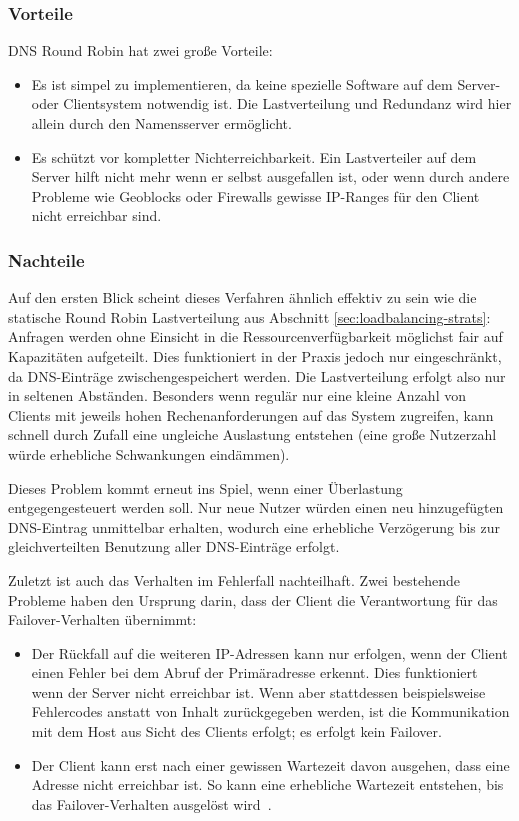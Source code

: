 \subsubsection{Vorteile}
DNS Round Robin hat zwei große Vorteile:
\begin{itemize}
	\item Es ist simpel zu implementieren, da keine spezielle Software auf dem Server- oder Clientsystem notwendig ist. Die Lastverteilung und Redundanz wird hier allein durch den Namensserver ermöglicht.
	\item Es schützt vor kompletter Nichterreichbarkeit. Ein Lastverteiler auf dem Server hilft nicht mehr wenn er selbst ausgefallen ist, oder wenn durch andere Probleme wie Geoblocks oder Firewalls gewisse IP-Ranges für den Client nicht erreichbar sind.
\end{itemize}

\subsubsection{Nachteile}
Auf den ersten Blick scheint dieses Verfahren ähnlich effektiv zu sein wie die statische Round Robin Lastverteilung aus Abschnitt \ref{sec:loadbalancing-strats}:
Anfragen werden ohne Einsicht in die Ressourcenverfügbarkeit möglichst fair auf Kapazitäten aufgeteilt.
Dies funktioniert in der Praxis jedoch nur eingeschränkt, da DNS-Einträge zwischengespeichert werden.
Die Lastverteilung erfolgt also nur in seltenen Abständen.
Besonders wenn regulär nur eine kleine Anzahl von Clients mit jeweils hohen Rechenanforderungen auf das System zugreifen,
kann schnell durch Zufall eine ungleiche Auslastung entstehen (eine große Nutzerzahl würde erhebliche Schwankungen eindämmen).

Dieses Problem kommt erneut ins Spiel, wenn einer Überlastung entgegengesteuert werden soll.
Nur neue Nutzer würden einen neu hinzugefügten DNS-Eintrag unmittelbar erhalten, wodurch eine erhebliche Verzögerung bis zur gleichverteilten Benutzung aller DNS-Einträge erfolgt.

Zuletzt ist auch das Verhalten im Fehlerfall nachteilhaft.
Zwei bestehende Probleme haben den Ursprung darin, dass der Client die Verantwortung für das Failover-Verhalten übernimmt:
\begin{itemize}
	\item Der Rückfall auf die weiteren IP-Adressen kann nur erfolgen, wenn der Client einen Fehler bei dem Abruf der Primäradresse erkennt. Dies funktioniert wenn der Server nicht erreichbar ist. Wenn aber stattdessen beispielsweise Fehlercodes anstatt von Inhalt zurückgegeben werden, ist die Kommunikation mit dem Host aus Sicht des Clients erfolgt; es erfolgt kein Failover.
	\item Der Client kann erst nach einer gewissen Wartezeit davon ausgehen, dass eine Adresse nicht erreichbar ist. So kann eine erhebliche Wartezeit entstehen, bis das Failover-Verhalten ausgelöst wird~\cite{so-dns-slow}.%
\end{itemize}

